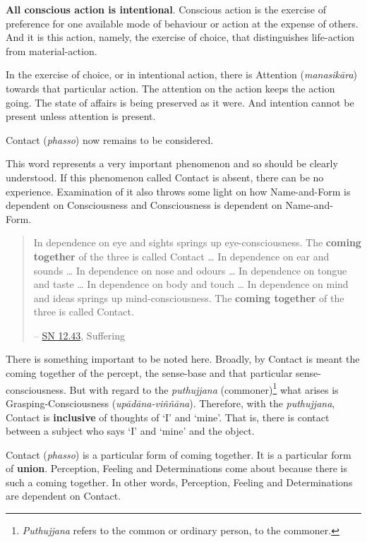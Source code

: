 \textbf{All conscious action is intentional}. Conscious action is the exercise of preference for one available mode of behaviour or action at the expense of others. And it is this action, namely, the exercise of choice, that distinguishes life-action from material-action.

In the exercise of choice, or in intentional action, there is Attention (\emph{manasikāra}) towards that particular action. The attention on the action keeps the action going. The state of affairs is being preserved as it were. And intention cannot be present unless attention is present.

Contact (\emph{phasso}) now remains to be considered.

This word represents a very important phenomenon and so should be clearly understood. If this phenomenon called Contact is absent, there can be no experience. Examination of it also throws some light on how Name-and-Form is dependent on Consciousness and Consciousness is dependent on Name-and- Form.

\begin{quote}
In dependence on eye and sights springs up eye-consciousness. The \textbf{coming together} of the three is called Contact \ldots{} In dependence on ear and sounds \ldots{} In dependence on nose and odours \ldots{} In dependence on tongue and taste \ldots{} In dependence on body and touch \ldots{} In dependence on mind and ideas springs up mind-consciousness. The \textbf{coming together} of the three is called Contact.

 -- \href{https://suttacentral.net/sn12.43/en/bodhi}{SN 12.43}, Suffering
\end{quote}

There is something important to be noted here. Broadly, by Contact is meant the coming together of the percept, the sense-base and that particular sense-consciousness. But with regard to the \emph{puthujjana} (commoner)\footnote{\emph{Puthujjana} refers to the common or ordinary person, to the commoner.} what arises is Grasping-Consciousness (\emph{upādāna-viññāna}). Therefore, with the \emph{puthujjana}, Contact is \textbf{inclusive} of thoughts of `I' and `mine'. That is, there is contact between a subject who says `I' and `mine' and the object.

Contact (\emph{phasso}) is a particular form of coming together. It is a particular form of \textbf{union}. Perception, Feeling and Determinations come about because there is such a coming together. In other words, Perception, Feeling and Determinations are dependent on Contact.

